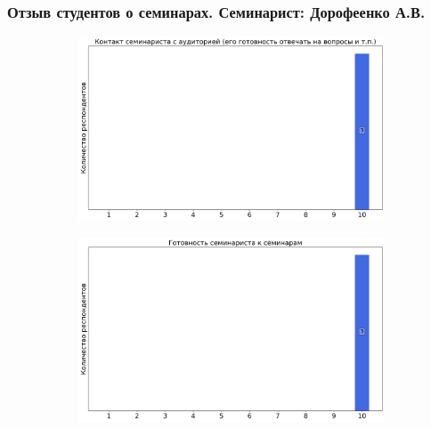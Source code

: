     \subsubsection{Отзыв студентов о семинарах. Семинарист: Дорофеенко А.В.}
        \begin{figure}[H]
            \centering
            \begin{subfigure}[b]{0.45\textwidth}
                \centering
                \includegraphics[width=\textwidth]{images/4 course/Квантовая механика/seminarists-marks-Дорофеенко А.В.-0.png}
            \end{subfigure}
            \begin{subfigure}[b]{0.45\textwidth}
                \centering
                \includegraphics[width=\textwidth]{images/4 course/Квантовая механика/seminarists-marks-Дорофеенко А.В.-1.png}
            \end{subfigure}
            \begin{subfigure}[b]{0.45\textwidth}
                \centering

\end{subfigure}
\end{figure}
